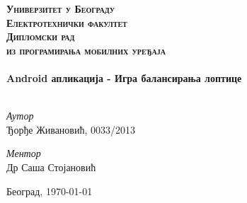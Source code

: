 

\begin{titlepage}

\begin{center}



\textsc{\Huge \textbf{Универзитет у Београду}} \\[1cm]
\textsc{\Huge \textbf{Електротехнички факултет}}\\[5cm]

\textsc{\Huge \textbf{Дипломски рад }}\\[0.5cm]
\textsc{\large{\textbf{из програмирања мобилних уређаја}}}
\\[4cm]

\HRule \\[0.8cm]
{ \Huge \bfseries Android апликација - Игра балансирања лоптице}\\[0.4cm]

\HRule \\[4cm]

\begin{minipage}{0.55\textwidth}
\begin{flushleft} \large
\emph{Аутор}\\
Ђорђе Живановић, 0033/2013\\
\end{flushleft}
\end{minipage}
\begin{minipage}{0.4\textwidth}
\begin{flushright} \large
\emph{Ментор} \\
Др Саша Стојановић
\end{flushright}
\end{minipage}



\vfill

{\large Београд, \today}

\end{center}

\end{titlepage}
